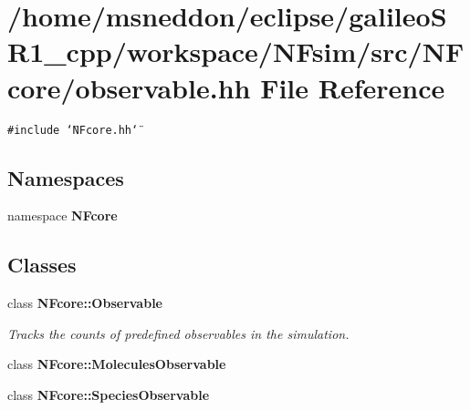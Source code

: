 \section{/home/msneddon/eclipse/galileoSR1\_\-cpp/workspace/NFsim/src/NFcore/observable.hh File Reference}
\label{observable_8hh}


{\tt \#include \char`\"{}NFcore.hh\char`\"{}}\par
\subsection*{Namespaces}
\begin{CompactItemize}
\item 
namespace {\bf NFcore}
\end{CompactItemize}
\subsection*{Classes}
\begin{CompactItemize}
\item 
class {\bf NFcore::Observable}
\begin{CompactList}\small\item\em Tracks the counts of predefined observables in the simulation. \item\end{CompactList}\item 
class {\bf NFcore::MoleculesObservable}
\item 
class {\bf NFcore::SpeciesObservable}
\end{CompactItemize}

